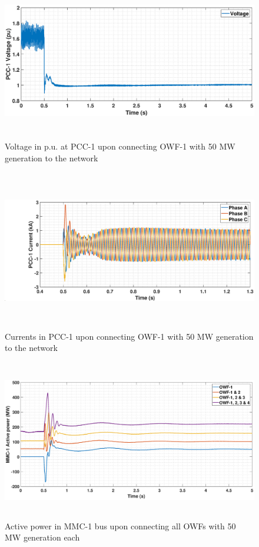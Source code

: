 \begin{figure}[H]
    \includegraphics[height = 7cm,width = \textwidth]{Diagrams/Chapter_5/VACP_WT1_WT1connect.eps}
    \caption{Voltage in p.u. at PCC-1 upon connecting OWF-1 with 50 MW generation to the network}
    \label{VACP_WT1_WT1connect}
\end{figure}

\begin{figure}[H]
    \includegraphics[height = 7cm,width = \textwidth]{Diagrams/Chapter_5/IABC_WT1_WT1connect.eps}
    \caption{Currents in PCC-1 upon connecting OWF-1 with 50 MW generation to the network}
    \label{IABC_WT1_WT1connect}
\end{figure}

\begin{figure}[H]
    \includegraphics[height = 7cm,width = \textwidth]{Diagrams/Chapter_5/P_MMC_1_WT1234connect_2.eps}
    \caption{Active power in MMC-1 bus upon connecting all OWFs with 50 MW generation each}
    \label{P_MMC_1_WT1234connect}
\end{figure}

